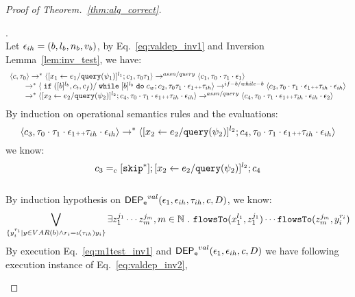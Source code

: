 \begin{proof}[Proof of Theorem.~\ref{thm:alg_correct}]
\begin{case}
\begin{subcase}
\begin{subsubcase}
\begin{subsubsubcase}.
\\
Let $\mathtt{\epsilon}_{ih} = (b, l_b, n_b, v_b)$, by Eq.~\ref{eq:valdep_inv1} and {Inversion Lemma~\ref{lem:inv_test}}, we have:
\begin{equation}
\label{eq:m1test_inv1}
  \begin{array}{l}   
\langle {c}, \mathtt{\tau}_0 \rangle \rightarrow^{*} 
\langle [\mathrel{ {x}_1 \leftarrow e_1 / {\tt query}(\psi_1) }]^{l_1} ; {c}_1, \mathtt{\tau}_0 \mathtt{\tau}_1 \rangle  
\rightarrow^{assn/query}
 \langle c_1, \mathtt{\tau}_0 \cdot \mathtt{\tau}_1 \cdot \mathtt{\epsilon}_1 \rangle 
 \\
  \qquad \rightarrow^{*} 
  \langle \;\mathtt{if}\; ([b]^{l_b}, c_t, c_f) / \;\mathtt{while}\; [b]^{l_b} \;\mathtt{do}\; c_w;{c}_2, 
  \mathtt{\tau}_0 \mathtt{\tau}_1 \cdot \mathtt{\epsilon}_1 {\scriptscriptstyle ++} \mathtt{\tau}_{ih} \rangle 
 \rightarrow^{if-b / while-b} 
  \langle c_3, 
  \mathtt{\tau}_0 \cdot \mathtt{\tau}_1 \cdot \mathtt{\epsilon}_1 {\scriptscriptstyle ++} \mathtt{\tau}_{ih} \cdot \mathtt{\epsilon}_{ih} \rangle 
  \\
  \qquad   \rightarrow^{*} 
  \langle [\mathrel{ {x}_2 \leftarrow e_2 / {\tt query}(\psi_2) }]^{l_2};{c}_4, 
  \mathtt{\tau}_0 \cdot \mathtt{\tau}_1 \cdot \mathtt{\epsilon}_1 {\scriptscriptstyle ++} \mathtt{\tau}_{ih} \cdot \mathtt{\epsilon}_{ih} \rangle 
  \rightarrow^{assn/query} 
  \langle {c}_4,  \mathtt{\tau}_0 \cdot \mathtt{\tau}_1 \cdot \mathtt{\epsilon}_1  {\scriptscriptstyle ++} \mathtt{\tau}_{ih} \cdot \mathtt{\epsilon}_{ih} \cdot \mathtt{\epsilon}_2 \rangle 
\end{array}
\end{equation}
 By induction on operational semantics rules and the evaluations: 
 \[
 \langle c_3, 
  \mathtt{\tau}_0 \cdot \mathtt{\tau}_1 \cdot \mathtt{\epsilon}_1 {\scriptscriptstyle ++} \mathtt{\tau}_{ih} \cdot \mathtt{\epsilon}_{ih} \rangle 
  \rightarrow^{*} 
  \langle [\mathrel{ {x}_2 \leftarrow e_2 / {\tt query}(\psi_2) }]^{l_2};{c}_4, 
  \mathtt{\tau}_0 \cdot \mathtt{\tau}_1 \cdot \mathtt{\epsilon}_1 {\scriptscriptstyle ++} \mathtt{\tau}_{ih} \cdot \mathtt{\epsilon}_{ih} \rangle 
 \]
 we know:
  \[
 c_3 =_c 
 [\mathtt{skip}^*]; [\mathrel{ {x}_2 \leftarrow e_2 / {\tt query}(\psi_2) }]^{l_2};{c}_4
 \]
\label{case:valdep_ihtestdep}
\\
%
By induction hypothesis on $\mathsf{DEP_{\mathtt{e}}}^{val}(\mathtt{\epsilon}_1, \mathtt{\epsilon}_{ih}, \mathtt{\tau}_{ih}, c, D)$, we know:
%
\begin{equation}
\label{eq:valdep_ihtestb}
  \bigvee_{\{y_i^{r_i} \vert y \in VAR(b) \land r_i = \iota(\mathtt{\tau}_{ih}) y_i\}}
  \exists z_1^{j_1} \cdots z_m^{j_m}, m \in \mathbb{N} ~.~ 
  \mathtt{flowsTo}(x_1^{l_1}, z_1^{j_1}) \cdots \mathtt{flowsTo}(z_m^{j_m}, y_i^{r_i})
\end{equation}
%
By execution Eq.~\ref{eq:m1test_inv1} and $\mathsf{DEP_{\mathtt{e}}}^{val}(\mathtt{\epsilon}_1, \mathtt{\epsilon}_{ih}, c, D)$ we have following execution instance of Eq.~\ref{eq:valdep_inv2},

\end{subsubsubcase}
\end{subsubcase}
\end{subcase}
\end{case}
\end{proof}
